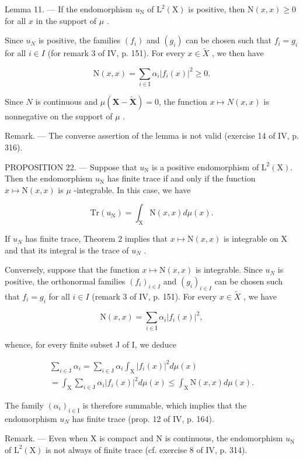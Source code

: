 Lemma 11. --- If the endomorphism \(u_{\mathrm{N}}\) of \(\mathrm{L}^2(\mathrm{X})\) is positive, then \(\mathrm{N}(x,x) \geqslant 0\) for all \(x\) in the support of \(\mu\) .

Since \(u_{N}\) is positive, the families \((f_{i})\) and \((g_{i})\) can be chosen such that \(f_{i} = g_{i}\) for all \(i \in I\) (for remark 3 of IV, p. 151). For every \(x \in \widetilde{X}\) , we then have

\[
\mathrm{N} (x, x) = \sum_ {i \in \mathrm{I}} \alpha_ {i} | f _ {i} (x) | ^ {2} \geqslant 0.
\]

Since \(N\) is continuous and \(\mu(\mathbf{X}-\widetilde{\mathbf{X}})=0\), the function \(x \mapsto N(x,x)\) is nonnegative on the support of \(\mu\) .

Remark. --- The converse assertion of the lemma is not valid (exercise 14 of IV, p. 316).

PROPOSITION 22. --- Suppose that \(u_{\mathrm{N}}\) is a positive endomorphism of \(\mathrm{L}^2(\mathrm{X})\). Then the endomorphism \(u_{\mathrm{N}}\) has finite trace if and only if the function \(x \mapsto \mathrm{N}(x,x)\) is \(\mu\) -integrable. In this case, we have

\[
\mathrm{Tr} (u _ {\mathrm{N}}) = \int_ {\mathrm{X}} \mathrm{N} (x, x) d \mu (x).
\]

If \(u_{N}\) has finite trace, Theorem 2 implies that \(x \mapsto \mathrm{N}(x, x)\) is integrable on X and that its integral is the trace of \(u_{N}\) .

Conversely, suppose that the function \(x \mapsto \mathrm{N}(x, x)\) is integrable. Since \(u_{N}\) is positive, the orthonormal families \((f_i)_{i \in I}\) and \((g_i)_{i \in I}\) can be chosen such that \(f_i = g_i\) for all \(i \in I\) (remark 3 of IV, p. 151). For every \(x \in \widetilde{X}\) , we have

\[
\mathrm{N} (x, x) = \sum_ {i \in \mathrm{I}} \alpha_ {i} | f _ {i} (x) | ^ {2},
\]

whence, for every finite subset J of I, we deduce

\[
\begin{array}{c} \sum_ {i \in \mathrm{J}} \alpha_ {i} = \sum_ {i \in \mathrm{J}} \alpha_ {i} \int_ {\mathrm{X}} | f _ {i} (x) | ^ {2} d \mu (x) \\ = \int_ {\mathrm{X}} \sum_ {i \in \mathrm{J}} \alpha_ {i} | f _ {i} (x) | ^ {2} d \mu (x) \leqslant \int_ {\mathrm{X}} \mathrm{N} (x, x) d \mu (x). \end{array}
\]

The family \((\alpha_{i})_{i\in\mathrm{I}}\) is therefore summable, which implies that the endomorphism \(u_{N}\) has finite trace (prop. 12 of IV, p. 164).

Remark. --- Even when X is compact and N is continuous, the endomorphism \(u_{\mathrm{N}}\) of \(\mathrm{L}^{2}(\mathrm{X})\) is not always of finite trace (cf. exercise 8 of IV, p. 314).

